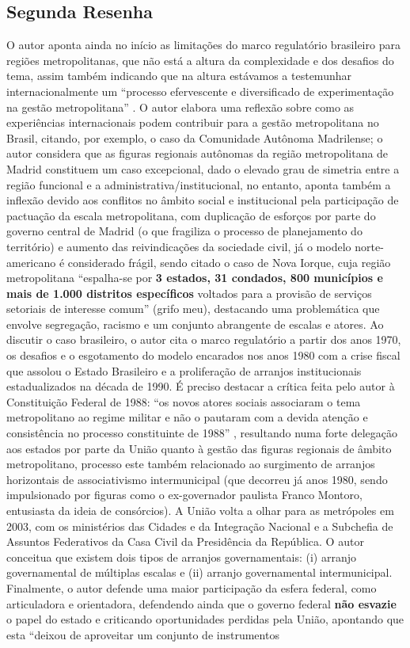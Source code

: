 \documentclass[hidelinks,a4paper,nofootinbib,aps,reprint,superscriptaddress]{revtex4}
\begin{document}
	\subsection{Segunda Resenha}
	
	O autor aponta ainda no início as limitações do marco regulatório brasileiro para regiões metropolitanas, que não está a altura da complexidade e dos desafios do tema, assim também indicando que na altura estávamos a testemunhar internacionalmente um ``processo efervescente e diversificado de experimentação na gestão metropolitana'' \cite[p.416]{klink2009}. O autor elabora uma reflexão sobre como as experiências internacionais podem contribuir para a gestão metropolitana no Brasil, citando, por exemplo, o caso da Comunidade Autônoma Madrilense; o autor considera que as figuras regionais autônomas da região metropolitana de Madrid constituem um caso excepcional, dado o elevado grau de simetria entre a região funcional e a administrativa/institucional, no entanto, aponta também a inflexão devido aos conflitos no âmbito social e institucional pela participação de pactuação da escala metropolitana, com duplicação de esforços por parte do governo central de Madrid (o que fragiliza o processo de planejamento do território) e aumento das reivindicações da sociedade civil, já o modelo norte-americano é considerado frágil, sendo citado o caso de Nova Iorque, cuja região metropolitana ``espalha-se por \textbf{3 estados, 31 condados, 800 municípios e mais de 1.000 distritos específicos} voltados para a provisão de serviços setoriais de interesse comum'' \cite[p.418]{klink2009} (grifo meu), destacando uma problemática que envolve segregação, racismo e um conjunto abrangente de escalas e atores. Ao discutir o caso brasileiro, o autor cita o marco regulatório a partir dos anos 1970, os desafios e o esgotamento do modelo encarados nos anos 1980 com a crise fiscal que assolou o Estado Brasileiro e a proliferação de arranjos institucionais estadualizados na década de 1990. É preciso destacar a crítica feita pelo autor à Constituição Federal de 1988: ``os novos atores sociais associaram o tema metropolitano ao regime militar e não o pautaram com a devida atenção e consistência no processo constituinte de 1988'' \cite[p.419]{klink2009}, resultando numa forte delegação aos estados por parte da União quanto à gestão das figuras regionais de âmbito metropolitano, processo este também relacionado ao surgimento de arranjos horizontais de associativismo intermunicipal (que decorreu já anos 1980, sendo impulsionado por figuras como o ex-governador paulista Franco Montoro, entusiasta da ideia de consórcios). A União volta a olhar para as metrópoles em 2003, com os ministérios das Cidades e da Integração Nacional e a Subchefia de Assuntos Federativos da Casa Civil da Presidência da República. O autor conceitua que existem dois tipos de arranjos governamentais: (i) arranjo governamental de múltiplas escalas e	(ii) arranjo governamental intermunicipal. Finalmente, o autor defende uma maior participação da esfera federal, como articuladora e orientadora, defendendo ainda que o governo federal \textbf{não esvazie} o papel do estado e criticando oportunidades perdidas pela União, apontando que esta ``deixou de aproveitar um conjunto de instrumentos 
\end{document}
